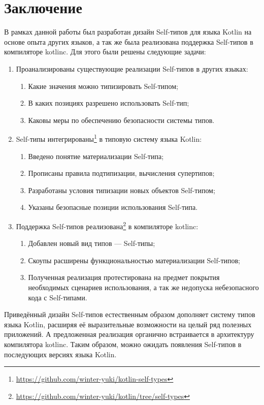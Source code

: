 \section*{Заключение}

В рамках данной работы был разработан дизайн Self-типов для языка Kotlin на основе опыта других языков, а так же была реализована поддержка Self-типов в компиляторе kotlinc.
Для этого были решены следующие задачи:
\begin{enumerate}
    \item Проанализированы существующие реализации Self-типов в других языках:
    \begin{enumerate}
        \item Какие значения можно типизировать Self-типом;
        \item В каких позициях разрешено использовать Self-тип;
        \item Каковы меры по обеспечению безопасности системы типов.
    \end{enumerate}
    \item Self-типы интегрированы\footnote{\url{https://github.com/winter-yuki/kotlin-self-types}} в типовую систему языка Kotlin:
    \begin{enumerate}
        \item Введено понятие материализации Self-типа;
        \item Прописаны правила подтипизации, вычисления супертипов;
        \item Разработаны условия типизации новых объектов Self-типом;
        \item Указаны безопасные позиции использования Self-типа.
    \end{enumerate}
    \item Поддержка Self-типов реализована\footnote{\url{https://github.com/winter-yuki/kotlin/tree/self-types}} в компиляторе kotlinc:
    \begin{enumerate}
        \item Добавлен новый вид типов --- Self-типы;
        \item Скоупы расширены функциональностью материализации Self-типов;
        \item Полученная реализация протестирована на предмет покрытия необходимых сценариев использования, а так же недопуска небезопасного кода с Self-типами.
    \end{enumerate}
\end{enumerate}

Приведённый дизайн Self-типов естественным образом дополняет систему типов языка Kotlin, расширяя её выразительные возможности на целый ряд полезных приложений.
А предложенная реализация органично встраивается в архитектуру компилятора kotlinc.
Таким образом, можно ожидать появления Self-типов в последующих версиях языка Kotlin.
